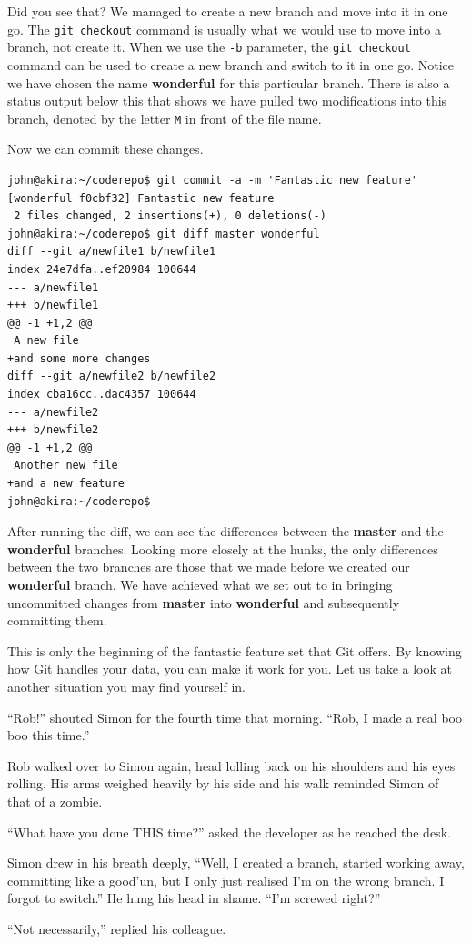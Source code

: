 Did you see that?  We managed to create a new branch and move into it in one go.  The \texttt{git checkout} command is usually what we would use to move into a branch, not create it.  When we use the \texttt{-b} parameter, the \texttt{git checkout} command can be used to create a new branch and switch to it in one go.  Notice we have chosen the name \textbf{wonderful} for this particular branch.  There is also a status output below this that shows we have pulled two modifications into this branch, denoted by the letter \texttt{M} in front of the file name.

Now we can commit these changes.

\begin{Verbatim}[frame=leftline,framerule=1mm,fontsize=\relsize{-3}] 
john@akira:~/coderepo$ git commit -a -m 'Fantastic new feature'
[wonderful f0cbf32] Fantastic new feature
 2 files changed, 2 insertions(+), 0 deletions(-)
john@akira:~/coderepo$ git diff master wonderful
diff --git a/newfile1 b/newfile1
index 24e7dfa..ef20984 100644
--- a/newfile1
+++ b/newfile1
@@ -1 +1,2 @@
 A new file
+and some more changes
diff --git a/newfile2 b/newfile2
index cba16cc..dac4357 100644
--- a/newfile2
+++ b/newfile2
@@ -1 +1,2 @@
 Another new file
+and a new feature
john@akira:~/coderepo$ 
\end{Verbatim}

After running the diff, we can see the differences between the \textbf{master} and the \textbf{wonderful} branches.  Looking more closely at the hunks, the only differences between the two branches are those that we made before we created our \textbf{wonderful} branch.  We have achieved what we set out to in bringing uncommitted changes from \textbf{master} into \textbf{wonderful} and subsequently committing them.

This is only the beginning of the fantastic feature set that Git offers.  By knowing how Git handles your data, you can make it work for you.  Let us take a look at another situation you may find yourself in.

\begin{trenches}
``Rob!'' shouted Simon for the fourth time that morning.  ``Rob, I made a real boo boo this time.''

Rob walked over to Simon again, head lolling back on his shoulders and his eyes rolling.  His arms weighed heavily by his side and his walk reminded Simon of that of a zombie.

``What have you done THIS time?'' asked the developer as he reached the desk.

Simon drew in his breath deeply, ``Well, I created a branch, started working away, committing like a good'un, but I only just realised I'm on the wrong branch.  I forgot to switch.''  He hung his head in shame.  ``I'm screwed right?''

``Not necessarily,'' replied his colleague.
\end{trenches}

